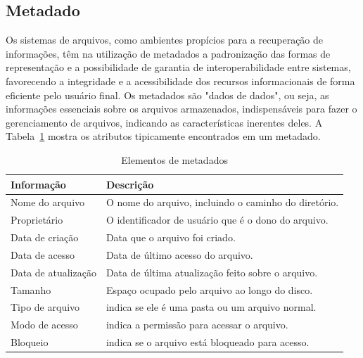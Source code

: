	\subsection{Metadado} 
	
	Os sistemas de arquivos, como ambientes propícios para a recuperação de informações, têm na utilização de metadados a padronização das formas de representação e a possibilidade de garantia de interoperabilidade entre sistemas, favorecendo a integridade e a acessibilidade dos recursos informacionais de forma eficiente pelo usuário final. Os metadados são "dados de dados", ou seja, as informações essenciais sobre os arquivos armazenados, indispensáveis para fazer o gerenciamento de arquivos, indicando as características inerentes deles. A Tabela~\ref{tab:metadado} mostra os atributos tipicamente encontrados em um metadado.
	
	\capstartfalse
	\begin{table} [htb]
		\caption{Elementos de metadados}
		\centering
		\begin{tabular}{|l|l|} \hline
			\textbf{Informação} & \textbf{Descrição} \\ \hline
			
			Nome do arquivo		& O nome do arquivo, incluindo o caminho do diretório.\\ \hline
			Proprietário		& O identificador de usuário que é o dono do arquivo.\\ \hline
			Data de criação     & Data que o arquivo foi criado.\\ \hline
			Data de acesso		& Data de último acesso do arquivo. \\ \hline
			Data de atualização	& Data de última atualização feito sobre o arquivo. \\ \hline
			Tamanho				& Espaço ocupado pelo arquivo ao longo do disco. \\ \hline
			Tipo de arquivo		& indica se ele é uma pasta ou um arquivo normal.  \\ \hline
			Modo de acesso		& indica a permissão para acessar o arquivo. \\ \hline
			Bloqueio			& indica se o arquivo está bloqueado para acesso. \\ \hline
			
		\end{tabular}
		\label{tab:metadado}
	\end{table}
	\capstarttrue
	

